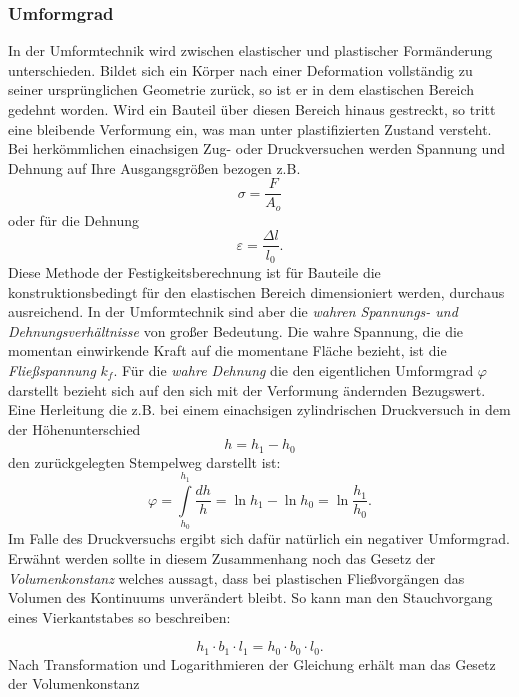 \documentclass[12pt,a4paper,parskip,twoside,BCOR5mm,headsepline]{scrartcl}
\begin{document}
\begin{description*}
\begin{itemize*}
\subsubsection{Umformgrad}
In der Umformtechnik wird zwischen elastischer und plastischer Formänderung unterschieden. Bildet sich ein Körper nach einer Deformation vollständig zu seiner ursprünglichen Geometrie zurück,  so ist er in dem elastischen Bereich gedehnt worden. Wird ein Bauteil über diesen Bereich hinaus gestreckt,  so tritt eine bleibende Verformung ein, was man unter plastifizierten Zustand versteht.  Bei herkömmlichen einachsigen Zug- oder Druckversuchen werden Spannung und Dehnung auf Ihre Ausgangsgrößen bezogen z.B. \begin{equation}\sigma=\frac{F}{A_o}\end{equation} oder für die Dehnung \begin{equation}\varepsilon = \frac{\Delta l}{l_0}.\end{equation} Diese Methode der Festigkeitsberechnung ist für Bauteile die konstruktionsbedingt für den elastischen Bereich dimensioniert werden,   durchaus ausreichend. In der Umformtechnik sind aber die \emph{wahren Spannungs- und Dehnungsverhältnisse} von großer Bedeutung. Die wahre Spannung, die die momentan einwirkende Kraft auf die momentane Fläche bezieht,  ist die \emph{Fließspannung} $ k_f $. Für die \emph{wahre Dehnung} die den eigentlichen Umformgrad $ \varphi $ darstellt bezieht sich auf den sich mit der Verformung ändernden Bezugswert. Eine Herleitung die z.B. bei einem einachsigen zylindrischen Druckversuch in dem der Höhenunterschied \begin{equation}
h=h_1-h_0 \end{equation}  den zurückgelegten Stempelweg darstellt ist:\begin{equation}
\varphi=\int\limits_{h_0}^{h_1}\frac{dh}{h}=\ln h_1 - \ln h_0 = \ln\frac{h_1}{h_0}.\end{equation} Im Falle des Druckversuchs ergibt sich dafür natürlich ein negativer Umformgrad. Erwähnt werden sollte in diesem Zusammenhang noch das Gesetz der \emph{Volumenkonstanz} welches aussagt, dass  bei plastischen Fließvorgängen das Volumen des Kontinuums unverändert bleibt. So kann man den Stauchvorgang eines Vierkantstabes so beschreiben: 






 \begin{equation}h_1 \cdot  b_1 \cdot l_1 = h_0 \cdot b_0 \cdot l_0.\end{equation} 
Nach Transformation und Logarithmieren der Gleichung erhält man
das Gesetz der Volumenkonstanz 
 

\end{itemize*}
\end{description*}
\end{document}
